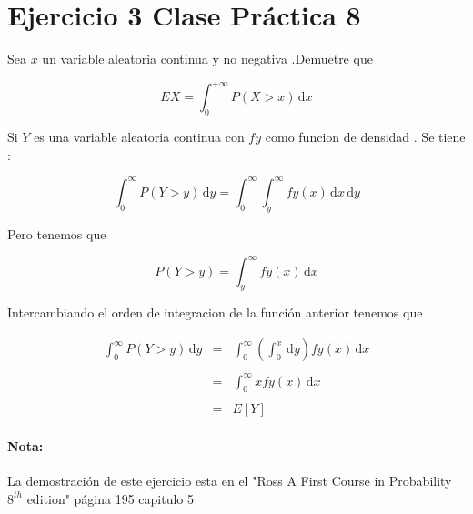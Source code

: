 \documentclass{article}
\begin{document}
    \section*{Ejercicio 3 Clase Pr\'actica 8}

    \begin{flushleft}
        
    
        Sea  $x$ un variable aleatoria continua y no negativa .Demuetre que 

        \begin{equation*}
            EX = \int_{0}^{+ \infty} P \left(X > x \right)  \,\mathrm{d}x 
        \end{equation*}

        Si $Y$ es una variable aleatoria continua con $fy$ como funcion de densidad .
        Se tiene : 

        \begin{equation*}
            \int_{0}^{\infty} P \left(Y > y\right)  \,\mathrm{d}y =  
            \int_{0}^{\infty} \int_{y}^{\infty}  fy \left(x\right)\,\mathrm{d}x  \,\mathrm{d}y
        \end{equation*}

        Pero tenemos que  

        \begin{equation*}
            P \left(Y > y \right) = 
            \int_{y}^{\infty} fy \left(x\right) \,\mathrm{d}x 
        \end{equation*}

        Intercambiando el orden de integracion de la funci\'on  anterior tenemos que 

        \begin{equation*}
            \begin{array}{rcl}
                \int_{0}^{\infty} P \left(Y > y \right) \,\mathrm{d}y &  =  &  \int_{0}^{\infty} \left(\int_{0}^{x}  \,\mathrm{d}y \right) fy\left(x\right) \,\mathrm{d}x 
                \\
                \\
                                                                    &  =  &  \int_{0}^{\infty} x fy\left(x\right) \,\mathrm{d}x
                \\
                \\
                                                                    &  =  &  E\left[Y\right]                                           
            \end{array}
        \end{equation*}

        \paragraph{Nota:} La demostraci\'on de este ejercicio esta en el "Ross A First Course in Probability $8^{th}$ edition"  p\'agina 195 capitulo 5

    \end{flushleft}
\end{document}
